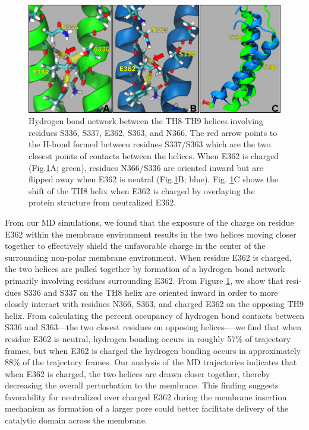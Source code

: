 \begin{figure}[H]
\centering
\includegraphics[width=\linewidth,]{Figures/DTT/hbonds_compare.png}
\caption[H-Bonds in DTT TH8-TH9 helices]{Hydrogen bond network between the TH8-TH9 helices involving residues S336, S337, E362, S363, and N366. The red arrow points to the H-bond formed between residues S337/S363 which are the two closest points of contacts between the helices. When E362 is charged (Fig.\ref{fig:dtt_hbonds}A; green), residues N366/S336 are oriented inward but are flipped away when E362 is neutral (Fig.\ref{fig:dtt_hbonds}B; blue). Fig. \ref{fig:dtt_hbonds}C shows the shift of the TH8 helix when E362 is charged by overlaying the protein structure from neutralized E362.}
\label{fig:dtt_hbonds}
\end{figure}

From our MD simulations, we found that the exposure of the charge on residue E362 within the membrane environment results in the two helices moving closer together to effectively shield the unfavorable charge in the center of the surrounding non-polar membrane environment. 
When residue E362 is charged, the two helices are pulled together by formation of a hydrogen bond network primarily involving residues surrounding E362.
From Figure \ref{fig:dtt_hbonds}, we show that resi- dues S336 and S337 on the TH8 helix are oriented inward in order to more closely interact with residues N366, S363, and charged E362 on the opposing TH9 helix.
From calculating the percent occupancy of hydrogen bond contacts between S336 and S363—the two closest residues on opposing helices-—we find that when residue E362 is neutral, hydrogen bonding occurs in roughly 57\% of trajectory frames, but when E362 is charged the hydrogen bonding occurs in approximately 88\% of the trajectory frames.
Our analysis of the MD trajectories indicates that when E362 is charged, the two helices are drawn closer together, thereby decreasing the overall perturbation to the membrane.
This finding suggests favorability for neutralized over charged E362 during the membrane insertion mechanism as formation of a larger pore could better facilitate delivery of the catalytic domain across the membrane.

